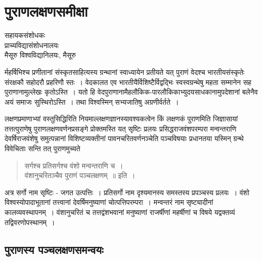 {\fontsize{15}{17}\selectfont
\chapter{पुराणलक्षणसमीक्षा}

\begin{center}
\smallskip

सहायकसंशोधकः\\
प्राच्यविद्यासंशोधनालयः\\
मैसूरु विश्वविद्यानिलयः, मैसूरु
\addrule
\end{center}

र्महर्षिभिश्च प्रणीतानां संस्कृतसाहित्यस्य ग्रन्थानां स्वाध्यायेन प्रतीयते यत् पुराणं वेदश्च भारतीयसंस्कृतेः संरक्षकौ सहोदरौ प्रहरिणौ स्तः~। वेदकालत एव भारतीयैर्विशिष्टैर्विद्वद्भिः स्वस्वग्रन्थेषु महता सम्मानेन सह पुराणानामुल्लेखः कृतोऽस्ति~। यतो हि वेदपुराणानामैहलौकिक-पारलौकिकाभ्युदयसाधकानामुपदेशानां बलेनैव अयं समाजः सुस्थिरोऽस्ति~। तथा विश्वस्मिन् सभ्यजातिषु अग्रणीर्वर्तते~।

लक्षणप्रमाणाभ्यां वस्तुसिद्धिरिति नियमाल्लक्षणज्ञानस्यावश्यकत्वेन किं लक्षणकं पुराणमिति जिज्ञासायां तत्तत्पुराणेषु पुराणलक्षणवर्णनप्रसङ्गे प्रोक्तमस्ति यत् सृष्टिः प्रलयः प्रसिद्धराजवंशपरम्परा मन्वन्तराणि देवर्षिराजवंशेषु समुत्पन्नानां विशिष्टव्यक्तीनां पावनचरितवर्णनञ्चेति पञ्चविषयाः प्रधानतया यस्मिन् ग्रन्थे विवेचिताः सन्ति तत् पुराणमुच्यते 
\begin{verse}
सर्गश्च प्रतिसर्गश्च वंशो मन्वन्तराणि च~।\\
वंशानुचरितञ्चैव पुराणं पञ्चलक्षणम्~॥ इति~।
\end{verse}
अत्र सर्गो नाम सृष्टिः - जगत उत्पत्तिः~। प्रतिसर्गो नाम दृश्यमानस्य समस्तस्य प्रपञ्चस्य प्रलयः~। वंशो विश्वस्योपादाभूतानां तत्त्वानां देवर्षिमनुष्याणां चोत्पत्तिपरम्परा~। मन्वन्तरं नाम सृष्ट्यादीनां कालव्यवस्थापनम्~। वंशानुचरितं च तत्तद्वंशभवानां मनुष्याणां राजर्षीणां महर्षीणां च विषये यद्वक्तव्यं तद्विवरणोपस्थानम्~।

\section*{पुराणस्य पञ्चलक्षणसमन्वयः}

}
